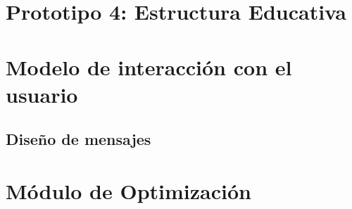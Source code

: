 \documentclass[10pt]{book}
\begin{document}
\chapter{Prototipo 4: Estructura Educativa}\label{chp:prototipo5}






\chapter{Modelo de interacción con el usuario}\label{chp:modeloInteraccionUsuario}

	\section{Diseño de mensajes}

\chapter{Módulo de Optimización}\label{chp:moduloOpt}
\end{document}
